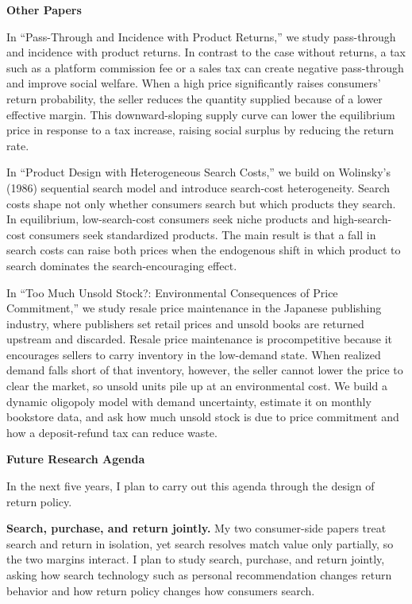 \documentclass[11pt]{article}
\begin{document}
\textbf{Other Papers}

In ``Pass-Through and Incidence with Product Returns,'' we study pass-through and incidence with product returns. In contrast to the case without returns, a tax such as a platform commission fee or a sales tax can create negative pass-through and improve social welfare. When a high price significantly raises consumers' return probability, the seller reduces the quantity supplied because of a lower effective margin. This downward-sloping supply curve can lower the equilibrium price in response to a tax increase, raising social surplus by reducing the return rate.

In ``Product Design with Heterogeneous Search Costs,'' we build on Wolinsky's (1986) sequential search model and introduce search-cost heterogeneity. Search costs shape not only whether consumers search but which products they search. In equilibrium, low-search-cost consumers seek niche products and high-search-cost consumers seek standardized products. The main result is that a fall in search costs can raise both prices when the endogenous shift in which product to search dominates the search-encouraging effect.

In ``Too Much Unsold Stock?: Environmental Consequences of Price Commitment,'' we study resale price maintenance in the Japanese publishing industry, where publishers set retail prices and unsold books are returned upstream and discarded. Resale price maintenance is procompetitive because it encourages sellers to carry inventory in the low-demand state. When realized demand falls short of that inventory, however, the seller cannot lower the price to clear the market, so unsold units pile up at an environmental cost. We build a dynamic oligopoly model with demand uncertainty, estimate it on monthly bookstore data, and ask how much unsold stock is due to price commitment and how a deposit-refund tax can reduce waste.

\textbf{Future Research Agenda}

In the next five years, I plan to carry out this agenda through the design of return policy.

\textbf{Search, purchase, and return jointly.} My two consumer-side papers treat search and return in isolation, yet search resolves match value only partially, so the two margins interact. I plan to study search, purchase, and return jointly, asking how search technology such as personal recommendation changes return behavior and how return policy changes how consumers search.
\end{document}
